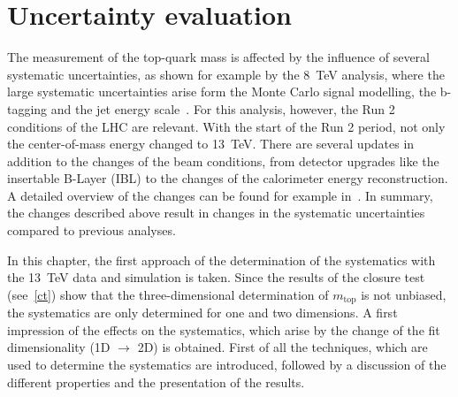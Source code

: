 \chapter{Uncertainty evaluation}
\label{sec:Uns}
The measurement of the top-quark mass is affected by the influence of several systematic uncertainties, as shown for example by the 8~TeV analysis, where the large systematic uncertainties arise form the Monte Carlo signal modelling, the b-tagging and the jet energy scale~\cite{ATLAS-CONF-2017-071}.  For this analysis, however, the Run 2 conditions of the LHC are relevant. With the start of the Run 2 period, not only the center-of-mass energy  changed to 13~TeV. There are several updates in addition to the changes of the beam conditions, from  detector upgrades like the  insertable B-Layer (IBL) to the changes of the calorimeter energy reconstruction. A detailed overview of the changes can be found for example in~\cite{ATL-PHYS-PUB-2015-015}. In summary, 
the changes described above result in changes in the systematic uncertainties compared to previous analyses. 

In this chapter, the first approach of the determination of  the systematics with the 13~TeV data and simulation is taken. 
Since the results of the closure test (see~\cref{ct}) show that the three-dimensional determination of $m_{\text{top}}$ is not unbiased, the systematics are only determined for one and two dimensions. 
 A first impression of the effects on the systematics, which arise by the change  of the fit dimensionality  (1D $\rightarrow$ 2D) is obtained.
First of all the techniques, which are used to determine the systematics are introduced, followed by a discussion of the different properties and the presentation of the results.   






